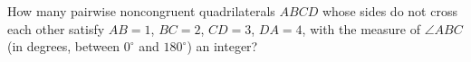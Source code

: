 How many pairwise noncongruent quadrilaterals $ABCD$ whose sides do not cross each other satisfy $AB=1$, $BC=2$, $CD=3$, $DA=4$, with the measure of $\angle ABC$ (in degrees, between $0^\circ$ and $180^\circ$) an integer?
